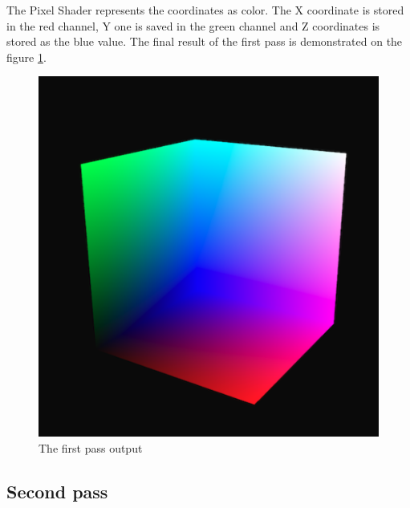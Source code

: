 \documentclass[twoside, english, 11pt]{report}
\begin{document}
The Pixel Shader represents the coordinates as color. The X coordinate is stored in the red channel, Y one is saved in the green channel and Z coordinates is stored as the blue value. The final result of the first pass is demonstrated on the figure \ref{fig:first}.
\begin{figure}[!h]
\centerline{\includegraphics[scale = 0.49]{img/first}}
\caption{The first pass output\label{fig:first}}
\end{figure}

\subsection{Second pass}
\end{document}
